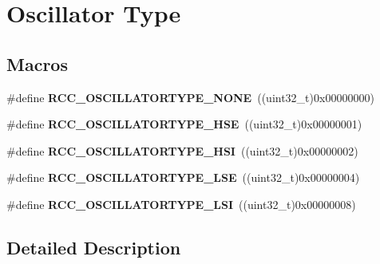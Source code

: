 \hypertarget{group___r_c_c___oscillator___type}{}\section{Oscillator Type}
\label{group___r_c_c___oscillator___type}
\subsection*{Macros}
\begin{DoxyCompactItemize}
\item 
\#define {\bfseries R\+C\+C\+\_\+\+O\+S\+C\+I\+L\+L\+A\+T\+O\+R\+T\+Y\+P\+E\+\_\+\+N\+O\+NE}~((uint32\+\_\+t)0x00000000)\hypertarget{group___r_c_c___oscillator___type_ga5a790362c5d7c4263f0f75a7367dd6b9}{}\label{group___r_c_c___oscillator___type_ga5a790362c5d7c4263f0f75a7367dd6b9}

\item 
\#define {\bfseries R\+C\+C\+\_\+\+O\+S\+C\+I\+L\+L\+A\+T\+O\+R\+T\+Y\+P\+E\+\_\+\+H\+SE}~((uint32\+\_\+t)0x00000001)\hypertarget{group___r_c_c___oscillator___type_ga28cacd402dec84e548c9e4ba86d4603f}{}\label{group___r_c_c___oscillator___type_ga28cacd402dec84e548c9e4ba86d4603f}

\item 
\#define {\bfseries R\+C\+C\+\_\+\+O\+S\+C\+I\+L\+L\+A\+T\+O\+R\+T\+Y\+P\+E\+\_\+\+H\+SI}~((uint32\+\_\+t)0x00000002)\hypertarget{group___r_c_c___oscillator___type_gaa7ff7cbe9b0c2c511b0d0555e2a32a23}{}\label{group___r_c_c___oscillator___type_gaa7ff7cbe9b0c2c511b0d0555e2a32a23}

\item 
\#define {\bfseries R\+C\+C\+\_\+\+O\+S\+C\+I\+L\+L\+A\+T\+O\+R\+T\+Y\+P\+E\+\_\+\+L\+SE}~((uint32\+\_\+t)0x00000004)\hypertarget{group___r_c_c___oscillator___type_ga7036aec5659343c695d795e04d9152ba}{}\label{group___r_c_c___oscillator___type_ga7036aec5659343c695d795e04d9152ba}

\item 
\#define {\bfseries R\+C\+C\+\_\+\+O\+S\+C\+I\+L\+L\+A\+T\+O\+R\+T\+Y\+P\+E\+\_\+\+L\+SI}~((uint32\+\_\+t)0x00000008)\hypertarget{group___r_c_c___oscillator___type_ga3b7abb8ce0544cca0aa4550540194ce2}{}\label{group___r_c_c___oscillator___type_ga3b7abb8ce0544cca0aa4550540194ce2}

\end{DoxyCompactItemize}


\subsection{Detailed Description}
